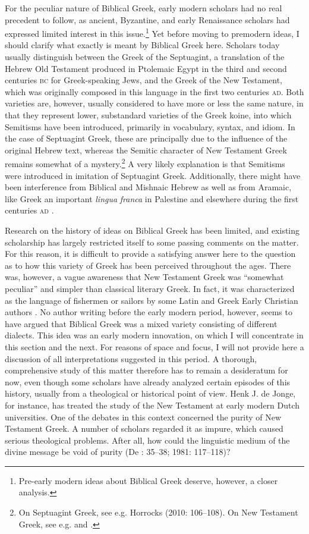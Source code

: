 For the peculiar nature of Biblical Greek, early modern scholars had no real precedent to follow, as ancient, Byzantine, and early Renaissance scholars had expressed limited interest in this issue.\footnote{Pre-early modern ideas about Biblical Greek deserve, however, a closer analysis.} Yet before moving to premodern ideas, I should clarify what exactly is meant by Biblical Greek here. Scholars today usually distinguish between the Greek of the Septuagint, a translation of the Hebrew Old Testament produced in Ptolemaic Egypt in the third and second centuries \textsc{bc} for Greek-speaking Jews, and the Greek of the New Testament, which was originally composed in this language in the first two centuries \textsc{ad}. Both varieties are, however, usually considered to have more or less the same nature, in that they represent lower, substandard varieties of the Greek koine, into which Semitisms have been introduced, primarily in vocabulary, syntax, and idiom. In the case of Septuagint Greek, these are principally due to the influence of the original Hebrew text, whereas the Semitic character of New Testament Greek remains somewhat of a mystery.\footnote{On Septuagint Greek, see e.g. Horrocks (2010: 106–108). On New Testament Greek, see e.g. \citet{Janse2007} and \citet{PorterPitts2013}.} A very likely explanation is that Semitisms were introduced in imitation of Septuagint Greek. Additionally, there might have been interference from Biblical and Mishnaic Hebrew as well as from Aramaic, like Greek an important \textit{lingua} \textit{franca} in Palestine and elsewhere during the first centuries \textsc{ad} \citep{Janse2007}.

Research on the history of ideas on Biblical Greek has been limited, and existing scholarship has largely restricted itself to some passing comments on the matter. For this reason, it is difficult to provide a satisfying answer here to the question as to how this variety of Greek has been perceived throughout the ages. There was, however, a vague awareness that New Testament Greek was “somewhat peculiar” and simpler than classical literary Greek. In fact, it was characterized as the language of fishermen or sailors by some Latin and Greek Early Christian authors \citep[647]{Janse2007}. No author writing before the early modern period, however, seems to have argued that Biblical Greek was a mixed variety consisting of different dialects. This idea was an early modern innovation, on which I will concentrate in this section and the next. For reasons of space and focus, I will not provide here a discussion of all interpretations suggested in this period. A thorough, comprehensive study of this matter therefore has to remain a desideratum for now, even though some scholars have already analyzed certain episodes of this history, usually from a theological or historical point of view. Henk J. de Jonge, for instance, has treated the study of the New Testament at early modern Dutch universities. One of the debates in this context concerned the purity of New Testament Greek. A number of scholars regarded it as impure, which caused serious theological problems. After all, how could the linguistic medium of the divine message be void of purity (De \citealt{Jonge1980}: 35–38; 1981: 117–118)?

